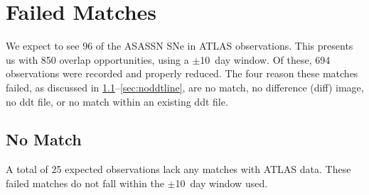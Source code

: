 \section{Failed Matches}\label{sec:failmatch}

We expect to see 96 of the ASASSN SNe in ATLAS observations. 
This presents us with 850 overlap opportunities, using a 
$\pm$10~day window. Of these, 694 observations were recorded 
and properly reduced.  %
The four reason these matches failed, as discussed in 
\cref{sec:nomatch}--\cref{sec:noddtline}, are no match, no difference (diff) 
image, no ddt file, or no match within an existing ddt file.

\subsection{No Match}\label{sec:nomatch}
A total of 25 expected observations lack any matches with ATLAS data. These failed 
matches do not fall within the $\pm$10~day window used.



